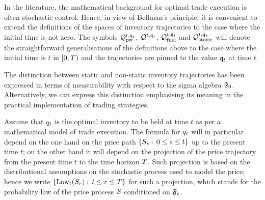 \documentclass[10pt,a4paper]{article}
\begin{document}
	In the literature, the mathematical background for optimal trade execution is often stochastic control. Hence, in view of Bellman's principle, it is convenient to extend the definitions of the spaces of inventory trajectories to the case where the initial time is not zero. The symbols $\mathcal{Q}_{\text{pw}}^{t,\mathfrak{q}_t}$, $\mathcal{Q}^{t,\mathfrak{q}_t}$, $\mathcal{Q}_{\text{fuel}}^{t,\mathfrak{q}_t}$ and $\mathcal{Q}_{\text{static}}^{t,\mathfrak{q}_t}$ will denote the straightforward generalisations of the definitions above to the case where the initial time is $t$ in $[0,T)$ and the trajectories are pinned to the value $\mathfrak{q}_t$ at time $t$. 
	
	The distinction between static and non-static inventory trajectories has been expressed in terms of measurability with respect to the sigma algebra $\mathfrak{F}_0$. Alternatively, we can express this distinction emphasising its meaning in the practical implementation of trading strategies. 
	
	Assume that $q_t$ is the optimal inventory to be held at time $t$ as per a mathematical model of trade execution. The formula for $q_t$ will in particular depend on the one hand on the price path $\lbrace S_s:\, 0\leq s\leq t\rbrace$ up to the present time $t$;  on the other hand it will depend on the projection of the price trajectory from the present time $t$ to the time horizon $T$. Such projection is based on the distributional assumptions on the stochastic process used to model the price; hence we write 
	$\lbrace \text{Law}_t (S_r): \, t\leq r\leq T\rbrace$ for such a projection, which stands for the probability law of the price process $S$ conditioned on $\mathfrak{F}_t$. 
	
\end{document}
